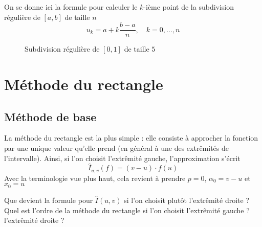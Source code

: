 On se donne ici la formule pour calculer le $ k $-ième point de la subdivision régulière de $ [a, b] $ de taille $ n $ \[
    u_k = a + k\frac{b-a}{n}, \quad k=0, \ldots, n
\]

\begin{figure}[h!]
    \centering
    \caption{Subdivision régulière de $ [0, 1] $ de taille $ 5 $}
    \label{fig:subdivision-reguliere}
\end{figure}

\section{Méthode du rectangle}

\subsection{Méthode de base}
La méthode du rectangle est la plus simple : elle consiste à approcher la fonction par une unique valeur qu'elle prend (en général à une des extrêmités de l'intervalle). Ainsi, si l'on choisit l'extrêmité gauche, l'approximation s'écrit \[
    \hat{I}_{u, v}(f) = (v-u) \cdot f(u)
\]
Avec la terminologie vue plus haut, cela revient à prendre $ p=0 $, $ \alpha_0=v-u $ et $ x_0=u $

\quessques Que devient la formule pour $ \hat{I}(u, v) $ si l'on choisit plutôt l'extrêmité droite ?
\ssques Quel est l'ordre de la méthode du rectangle si l'on choisit l'extrêmité gauche ? l'extrêmité droite ?

